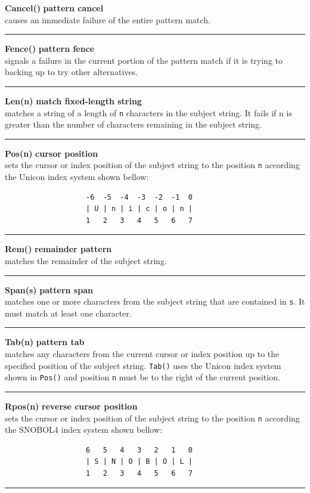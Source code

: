 \documentclass{article}
\begin{document}
\noindent\textbf{Cancel()} \hfill\textbf{pattern cancel}\\
causes an immediate failure of the entire pattern match.\\
\noindent\rule{15cm}{0.1pt}

\noindent\textbf{Fence()} \hfill\textbf{pattern fence}\\
signals a failure in the current portion of the pattern match if it is trying to backing up to try other alternatives.\\
\noindent\rule{15cm}{0.1pt}

\noindent\textbf{Len(n)} \hfill\textbf{match fixed-length string}\\
matches a string of a length of \texttt{n} characters in the subject string.  It fails if n is greater than the number of characters remaining in the subject string.\\
\noindent\rule{15cm}{0.1pt}

\noindent\textbf{Pos(n)} \hfill\textbf{cursor position}\\
sets the cursor or index position of the subject string to the position \texttt{n} according the Unicon index system shown bellow:
\begin{verbatim}
                   -6  -5  -4  -3  -2  -1  0
                   | U | n | i | c | o | n |
                   1   2   3   4   5   6   7
\end{verbatim}
\noindent\rule{15cm}{0.1pt}

\noindent\textbf{Rem()} \hfill\textbf{remainder pattern}\\
matches the remainder of the subject string.\\
\noindent\rule{15cm}{0.1pt}

\noindent\textbf{Span(s)} \hfill\textbf{pattern span}\\
matches one or more characters from the subject string that are contained in \texttt{s}.  It must match at least one character.\\
\noindent\rule{15cm}{0.1pt}

\noindent\textbf{Tab(n)} \hfill\textbf{pattern tab}\\
matches any characters from the current cursor or index position up to the specified position of the subject string.  \texttt{Tab()} uses the Unicon index system shown in \texttt{Pos()} and position \texttt{n} must be to the right of the current position.\\
\noindent\rule{15cm}{0.1pt}

\noindent\textbf{Rpos(n)} \hfill\textbf{reverse cursor position}\\
sets the cursor or index position of the subject string to the position \texttt{n} according the SNOBOL4 index system shown bellow:
\begin{verbatim}
                   6   5   4   3   2   1   0
                   | S | N | O | B | O | L |
                   1   2   3   4   5   6   7
\end{verbatim}
\noindent\rule{15cm}{0.1pt}
\end{document}
